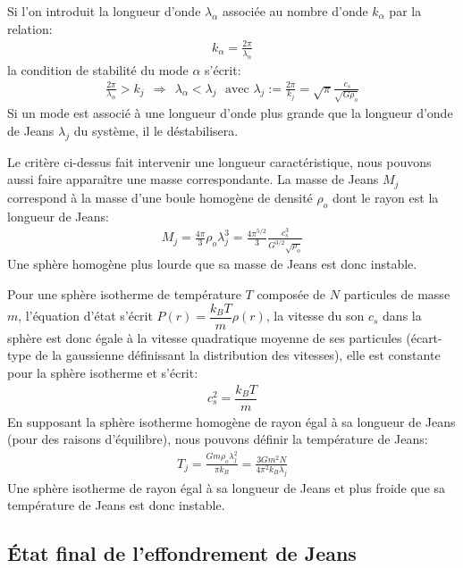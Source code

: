 Si l'on introduit la longueur d'onde $\lambda_{\alpha}$ associée au
nombre d'onde $k_{\alpha}$ par la relation:
\begin{align*}
	k_{\alpha}=\frac{2\pi}{\lambda_{\alpha}}
\end{align*}
la condition de stabilité du mode $\alpha$ s'écrit:
\begin{align*}
	\frac{2\pi}{\lambda_{\alpha}}>k_{j}\ \ \Rightarrow\ \ \lambda_{\alpha}<\lambda_{j}\ \ \ \text{avec\ \ }\lambda_{j}:=\frac{2\pi}{k_{j}}=\sqrt{\pi}\frac{\ c_{s}}{\sqrt{G\rho_{o}}}
\end{align*}
Si un mode est associé à une longueur d'onde plus grande que la longueur d'onde de Jeans $\lambda_{j}$ du système, il le déstabilisera.

Le critère ci-dessus fait intervenir une longueur caractéristique, nous pouvons aussi faire apparaître une masse correspondante. La masse de Jeans $M_j$
correspond à la masse d'une boule homogène de densité $\rho_o$ dont le rayon est la longueur de Jeans:
\begin{align}
	M_j = \frac{4\pi}{3}\rho_{o} \lambda_{j}^3 =  \frac{4\pi^{5/2}}{3} \frac{c_{s}^3}{G^{3/2}\sqrt{\rho_{o}}}
\end{align}
Une sphère homogène plus lourde que sa masse de Jeans est donc instable.

Pour une sphère isotherme de température $T$ composée de $N$ particules de masse $m$, l'équation d'état s'écrit $P(r)=\dfrac{k_B T}{m}\rho
(r)$, la vitesse du son $c_s$ dans la sphère est donc égale à la vitesse quadratique moyenne de ses particules (écart-type de la gaussienne
définissant la distribution des vitesses), elle est constante pour la sphère isotherme et s'écrit:
\begin{align*}
	c_s^2= \dfrac{ k_B T}{m}
\end{align*}
En supposant la sphère isotherme homogène de rayon égal à sa longueur de Jeans (pour des raisons d'équilibre), nous pouvons définir la température de
Jeans:
\begin{align}
	T_j= \frac{Gm\rho_{o}\lambda_{j}^2}{\pi k_B}=\frac{3Gm^2N}{4\pi^2 k_B\lambda_{j}}
\end{align}
Une sphère isotherme de rayon égal à sa longueur de Jeans et plus froide que sa température de Jeans est donc instable.

\subsection{État final de l'effondrement de Jeans}

